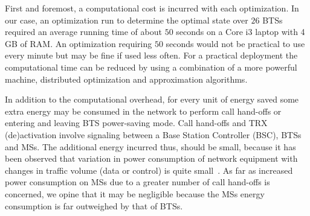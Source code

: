 First and foremost, a computational cost is incurred with each optimization. In our case, an optimization run to determine the optimal state over $26$ BTSs required an average running time of about $50$ seconds on a Core i3 laptop with 4 GB of RAM. An optimization requiring $50$ seconds would not be practical to use every minute but may be fine if used less often. For a practical deployment the computational time can be reduced by using a combination of a more powerful machine, distributed optimization and approximation algorithms. 

In addition to the computational overhead, for every unit of energy saved some extra energy may be consumed in the network to perform call hand-offs or entering and leaving BTS power-saving mode. Call hand-offs and TRX (de)activation involve signaling between a Base Station Controller (BSC), BTSs and MSs. The additional energy incurred thus, should be small, because it has been observed that variation in power consumption of network equipment with changes in traffic volume (data or control) is quite small~\cite{Chabarek08powerawareness}. As far as increased power consumption on MSs due to a greater number of call hand-offs is concerned, we opine that it may be negligible because the MSs energy consumption is far outweighed by that of BTSs. %

